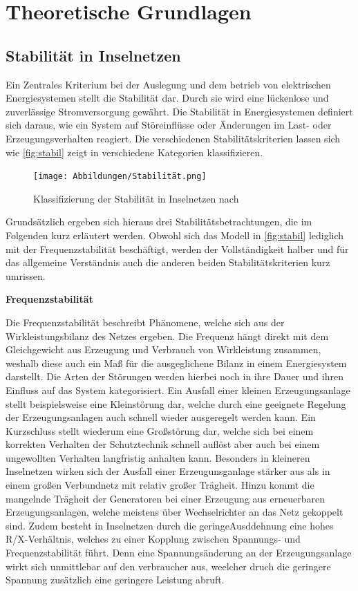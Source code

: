 \chapter{Theoretische Grundlagen}

\section{Stabilität in Inselnetzen}

Ein Zentrales Kriterium bei der Auslegung und dem betrieb von elektrischen Energiesystemen stellt die Stabilität dar. Durch sie wird eine lückenlose und zuverlässige Stromversorgung gewährt. Die Stabilität in Energiesystemen definiert sich daraus, wie ein System auf Störeinflüsse oder Änderungen im Last- oder Erzeugungsverhalten reagiert. Die verschiedenen Stabilitätskriterien lassen sich wie  \autoref{fig:stabil} zeigt in verschiedene Kategorien klassifizieren. 

\begin{figure}[H]
	\centering
	\texttt{[image: Abbildungen/Stabilität.png]}
	\caption{Klassifizierung der Stabilität in Inselnetzen nach}
	\label{fig:stabil}
\end{figure}

Grundsätzlich ergeben sich hieraus drei Stabilitätsbetrachtungen, die im Folgenden kurz erläutert werden. Obwohl sich das Modell in \autoref{fig:stabil} lediglich mit der Frequenzstabilität beschäftigt, werden der Vollständigkeit halber und für das allgemeine Verständnis auch die anderen beiden Stabilitätskriterien kurz umrissen.

\textbf{Frequenzstabilität}

Die Frequenzstabilität beschreibt Phänomene, welche sich aus der Wirkleistungsbilanz des Netzes ergeben. Die Frequenz hängt direkt mit dem Gleichgewicht aus Erzeugung und Verbrauch von Wirkleistung zusammen, weshalb diese auch ein Maß für die ausgeglichene Bilanz in einem Energiesystem darstellt. Die Arten der Störungen werden hierbei noch in ihre Dauer und ihren Einfluss auf das System kategorisiert. Ein Ausfall einer kleinen Erzeugungsanlage stellt beispielsweise eine Kleinstörung dar, welche durch eine geeignete Regelung der Erzeugungsanlagen auch schnell wieder ausgeregelt werden kann. Ein Kurzschluss stellt wiederum eine Großstörung dar, welche sich bei einem korrekten Verhalten der Schutztechnik schnell auflöst aber auch bei einem ungewollten Verhalten langfristig anhalten kann. Besonders in kleineren Inselnetzen wirken sich der Ausfall einer Erzeugunsganlage stärker aus als in einem großen Verbundnetz mit relativ großer Trägheit. Hinzu kommt die mangelnde Trägheit der Generatoren bei einer Erzeugung aus erneuerbaren Erzeugungsanlagen, welche meistens über Wechselrichter an das Netz gekoppelt sind. \cite{Simulationsmethode} Zudem besteht in Inselnetzen durch die geringeAusddehnung eine hohes R/X-Verhältnis, welches zu einer Kopplung zwischen Spannungs- und Frequenzstabilität führt. Denn eine Spannungsänderung an der Erzeugungsanlage wirkt sich unmittlebar auf den verbraucher aus, weelcher druch die geringere Spannung zusätzlich eine geringere Leistung abruft. \cite{Willenberg}

